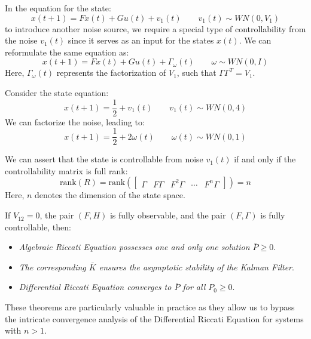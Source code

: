 In the equation for the state:
\[x(t+1)=Fx(t)+Gu(t)+v_1(t) \qquad v_1(t)\sim WN(0,V_1)\]
to introduce another noise source, we require a special type of controllability from the noise $v_1(t)$ since it serves as an input for the states $x(t)$. 
We can reformulate the same equation as:
\[x(t+1)=Fx(t)+Gu(t)+\Gamma_\omega(t) \qquad \omega\sim WN(0,I)\]
Here, $\Gamma_\omega(t)$ represents the factorization of $V_1$, such that $\Gamma\Gamma^T=V_1$.
\begin{example}
    Consider the state equation:
    \[x(t+1)=\dfrac{1}{2}+v_1(t)\qquad v_1(t)\sim WN(0,4)\]
    We can factorize the noise, leading to:
    \[x(t+1)=\dfrac{1}{2}+2\omega(t)\qquad \omega(t)\sim WN(0,1)\]
\end{example}

We can assert that the state is controllable from noise $v_1(t)$ if and only if the controllability matrix is full rank:
\[\text{rank}(R)=\text{rank}\left(\begin{bmatrix} \Gamma & F\Gamma & F^2\Gamma & \cdots & F^n\Gamma \end{bmatrix} \right)=n\]
Here, $n$ denotes the dimension of the state space.
\begin{theorem}
    If $V_{12}=0$, the pair $(F,H)$ is fully observable, and the pair $(F,\Gamma)$ is fully controllable, then:
\end{theorem}  
\begin{itemize}
    \item \textit{Algebraic Riccati Equation possesses one and only one solution $\bar{P}\geq 0$}. 
    \item \textit{The corresponding $\bar{K}$ ensures the asymptotic stability of the Kalman Filter}. 
    \item \textit{Differential Riccati Equation converges to $\bar{P}$ for all $P_0\geq 0$}. 
\end{itemize}
These theorems are particularly valuable in practice as they allow us to bypass the intricate convergence analysis of the Differential Riccati Equation for systems with $n>1$.
